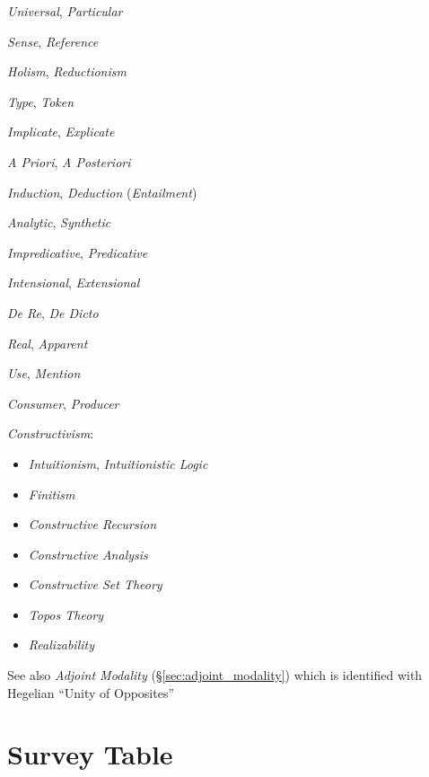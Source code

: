 \emph{Universal}, \emph{Particular}

\emph{Sense}, \emph{Reference}

\emph{Holism}, \emph{Reductionism}

\emph{Type}, \emph{Token}

\emph{Implicate}, \emph{Explicate}

\emph{A Priori}, \emph{A Posteriori}

\emph{Induction}, \emph{Deduction} (\emph{Entailment})

\emph{Analytic}, \emph{Synthetic}

\emph{Impredicative}, \emph{Predicative}

\emph{Intensional}, \emph{Extensional}

\emph{De Re}, \emph{De Dicto}

\emph{Real}, \emph{Apparent}

\emph{Use}, \emph{Mention}

\emph{Consumer}, \emph{Producer}

\emph{Constructivism}:
\begin{itemize}
    \item \emph{Intuitionism}, \emph{Intuitionistic Logic}
    \item \emph{Finitism}
    \item \emph{Constructive Recursion}
    \item \emph{Constructive Analysis}
    \item \emph{Constructive Set Theory}
    \item \emph{Topos Theory}
    \item \emph{Realizability}
\end{itemize}

\fist See also \emph{Adjoint Modality} (\S\ref{sec:adjoint_modality})
which is identified with Hegelian ``Unity of Opposites''



\section{Survey Table}

